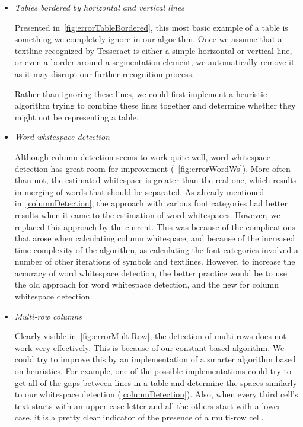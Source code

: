 \begin{itemize}
    \item \emph{Tables bordered by horizontal and vertical lines}
    
    Presented in~\cref{fig:errorTableBordered}, this most basic example of a table is something we completely ignore in our algorithm. Once we assume that a textline recognized by Tesseract is either a simple horizontal or vertical line, or even a border around a segmentation element, we automatically remove it as it may disrupt our further recognition process.
    
    Rather than ignoring these lines, we could first implement a heuristic algorithm trying to combine these lines together and determine whether they might not be representing a table.
    
    \item \emph{Word whitespace detection}

    Although column detection seems to work quite well, word whitespace detection has great room for improvement (~\cref{fig:errorWordWs}). More often than not, the estimated whitespace is greater than the real one, which results in merging of words that should be separated. As already mentioned in~\cref{columnDetection}, the approach with various font categories had better results when it came to the estimation of word whitespaces. However, we replaced this approach by the current. This was because of the complications that arose when calculating column whitespace, and because of the increased time complexity of the algorithm, as calculating the font categories involved a number of other iterations of symbols and textlines. However, to increase the accuracy of word whitespace detection, the better practice would be to use the old approach for word whitespace detection, and the new for column whitespace detection. 
    
    \item \emph{Multi-row columns}
    
    Clearly visible in~\cref{fig:errorMultiRow}, the detection of multi-rows does not work very effectively. This is because of our constant based algorithm. We could try to improve this by an implementation of a smarter algorithm based on heuristics. For example, one of the possible implementations could try to get all of the gaps between lines in a table and determine the spaces similarly to our whitespace detection (\cref{columnDetection}). Also, when every third cell's text starts with an upper case letter and all the others start with a lower case, it is a pretty clear indicator of the presence of a multi-row cell.
    

\end{itemize}
